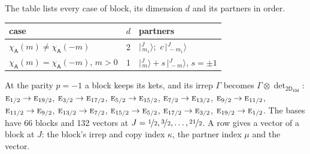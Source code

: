 \documentclass[10pt,a4paper]{article}
\numberwithin{equation}{section}
\newcommand{\grp}[1]{\mathsf{#1}}
\newcommand{\irr}[1]{\text{\normalfont\scshape #1}}
\newcommand{\chiA}{\chi_{\grp{A}}}
\newcommand{\irrprod}{\otimes}
\newcommand{\mult}{\kappa}
\newcommand{\intx}{\mu}
\newcommand{\jm}[2]{\bigl\lvert{}^{#1}_{\,#2}\bigr\rangle}
\begin{document}
\leavevmode\label{n:head.case}\label{n:head.partners}The table lists every case of block, its dimension $d$ and its partners in order.
\begin{center}\begin{tabular}{@{}lrl@{}}\toprule
case & $d$ & partners\\\midrule
$\chiA(m) \ne \chiA(-m)$ & 2 & $\jm{J}{m_1}$;\ $c\,\jm{J}{-m_1}$\\
$\chiA(m) = \chiA(-m)$, $m > 0$ & 1 & $\jm{J}{m} + s\,\jm{J}{-m}$, $s = \pm1$\\
\bottomrule\end{tabular}\end{center}
At the parity $p = -1$ a block keeps its kets, and its irrep $\Gamma$ becomes $\Gamma \irrprod \det_{\grp{2D_{10d}}}$: $\irr{e}_{1/2} \to \irr{e}_{19/2}$, $\irr{e}_{3/2} \to \irr{e}_{17/2}$, $\irr{e}_{5/2} \to \irr{e}_{15/2}$, $\irr{e}_{7/2} \to \irr{e}_{13/2}$, $\irr{e}_{9/2} \to \irr{e}_{11/2}$, $\irr{e}_{11/2} \to \irr{e}_{9/2}$, $\irr{e}_{13/2} \to \irr{e}_{7/2}$, $\irr{e}_{15/2} \to \irr{e}_{5/2}$, $\irr{e}_{17/2} \to \irr{e}_{3/2}$, $\irr{e}_{19/2} \to \irr{e}_{1/2}$.
The bases have 66 blocks and 132 vectors at $J = \nicefrac{1}{2}, \nicefrac{3}{2}, \dots, \nicefrac{21}{2}$. \label{n:head.vector}A row gives a vector of a block at $J$: the block's irrep and copy index $\mult$, the partner index $\intx$ and the vector.
\end{document}
